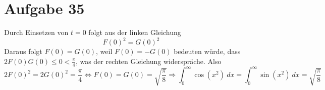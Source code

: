 \documentclass[10pt,a4paper]{article}
\begin{document}
\section{Aufgabe 35}
Durch Einsetzen von $t = 0$ folgt aus der linken Gleichung
\begin{equation}
  F(0)^{2} = G(0)^{2}
\end{equation}
Daraus folgt $F(0) = G(0)$, weil $F(0) = -G(0)$ bedeuten würde, dass $2F(0)G(0) \le 0 < \frac{\pi}{4}$, was der rechten Gleichung widerspräche.
Also
\begin{equation}
  2F(0)^{2} = 2G(0)^{2} = \frac{\pi}{4} \Leftrightarrow F(0) = G(0) = \sqrt{\frac{\pi}{8}} \Rightarrow \int_{0}^{\infty} \cos(x^{2})\ dx = \int_{0}^{\infty} \sin(x^{2})\ dx = \sqrt{\frac{\pi}{8}}
\end{equation}
\end{document}
